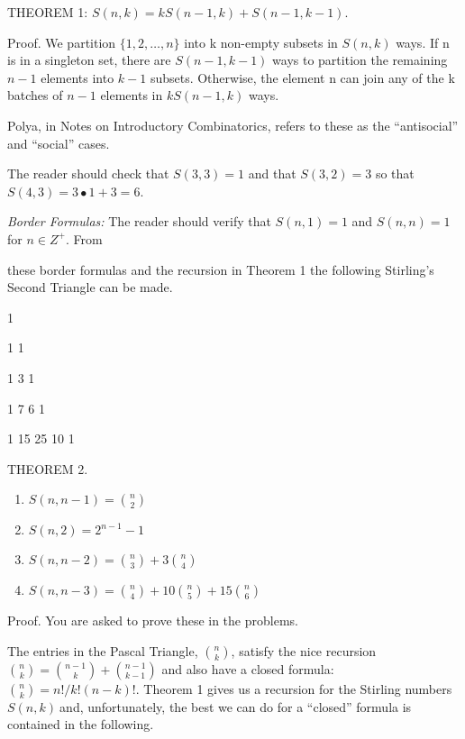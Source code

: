 THEOREM 1:
\(S\left( n,k \right) = kS\left( n - 1,k \right) + S(n - 1,k - 1)\).

Proof. We partition \(\{ 1,2,\ldots,n\}\) into k non-empty subsets in
\(S(n,k)\) ways. If n is in a singleton set, there are
\(S(n - 1,k - 1)\) ways to partition the remaining \(n - 1\) elements
into \(k - 1\) subsets. Otherwise, the element n can join any of the k
batches of \(n - 1\) elements in \(kS(n - 1,k)\) ways.

Polya, in Notes on Introductory Combinatorics, refers to these as the
``antisocial'' and ``social'' cases.

The reader should check that \(S\left( 3,3 \right) = 1\) and that
\(S\left( 3,2 \right) = 3\) so that
\(S\left( 4,3 \right) = 3 \bullet 1 + 3 = 6\).

\emph{Border Formulas:} The reader should verify that
\(S\left( n,1 \right) = 1\) and \(S\left( n,n \right) = 1\) for
\(n \in Z^{+}\). From

these border formulas and the recursion in Theorem 1 the following
Stirling's Second Triangle can be made.

1

1 1

1 3 1

1 7 6 1

1 15 25 10 1

THEOREM 2.
\begin{enumerate}
\def\labelenumi{(\alph{enumi})}

\item
  \(S\left( n,n - 1 \right) =\binom{n}{2}
\)
\item
  \(S\left( n,2 \right) = 2^{n - 1} - 1\)
\item
  \(S\left( n,n - 2 \right) =\binom{n}{3}
 + 3\binom{n}{4}
\)
\item
  \(S\left( n,n - 3 \right) =\binom{n}{4}
 + 10\binom{n}{5}
 + 15\binom{n}{6}
\)

\end{enumerate}

Proof. You are asked to prove these in the problems.

The entries in the Pascal Triangle, \(\binom{n}{k}
\), satisfy the nice recursion \(\binom{n}{k}
 =
\binom{n - 1}{k}
 +\binom{n - 1}{k - 1}
\) and also have a closed formula: \(\binom{n}{k}
 = n!/k!\left( n - k \right)!\). Theorem 1 gives us a
recursion for the Stirling numbers \(S\left( n,k \right)\ \)and,
unfortunately, the best we can do for a ``closed'' formula is contained
in the following.

